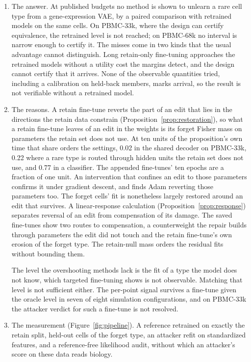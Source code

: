 \documentclass{article}
\begin{document}
\begin{enumerate}
    \item The answer. At published budgets no method is shown to unlearn a rare cell type from a gene-expression VAE, by a paired comparison with retrained models on the same cells. On PBMC-33k, where the design can certify equivalence, the retrained level is not reached; on PBMC-68k no interval is narrow enough to certify it. The misses come in two kinds that the usual advantage cannot distinguish. Long retain-only fine-tuning approaches the retrained models without a utility cost the margins detect, and the design cannot certify that it arrives. None of the observable quantities tried, including a calibration on held-back members, marks arrival, so the result is not verifiable without a retrained model.
    \item The reasons. A retain fine-tune reverts the part of an edit that lies in the directions the retain data constrain (Proposition~\ref{prop:restoration}), so what a retain fine-tune leaves of an edit in the weights is its forget Fisher mass on parameters the retain set does not use. At ten units of the proposition's own time that share orders the settings, 0.02 in the shared decoder on PBMC-33k, 0.22 where a rare type is routed through hidden units the retain set does not use, and 0.77 in a classifier. The appended fine-tunes' ten epochs are a fraction of one unit. An intervention that confines an edit to those parameters confirms it under gradient descent, and finds Adam reverting those parameters too. The forget cells' fit is nonetheless largely restored around an edit that survives. A linear-response calculation (Proposition~\ref{prop:response}) separates reversal of an edit from compensation of its damage. The saved fine-tunes show two routes to compensation, a counterweight the repair builds through parameters the edit did not touch and the retain fine-tune's own erosion of the forget type. The retain-null mass orders the residual fits without bounding them.

    The level the overshooting methods lack is the fit of a type the model does not know, which targeted fine-tuning shows is not observable. Matching that level is not sufficient either. The per-point signal survives a fine-tune given the oracle level in seven of eight simulation configurations, and on PBMC-33k the attacker verdict for such a fine-tune is not resolved.
    \item The measurement (Figure~\ref{fig:pipeline}). A reference retrained on exactly the retain split, held-out cells of the forget type, an attacker refit on standardized features, and a reference-free likelihood audit, without which an attacker's score on these data reads biology.
\end{enumerate}
\end{document}
